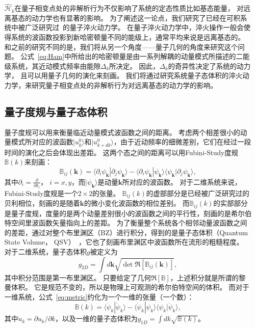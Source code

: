 			$\hat{\mathcal{H}}_k$在量子相变点处的非解析行为不仅影响了系统的定态性质比如基态能量， 对远离基态的动力学也有显著的影响。
			为了阐述这一论点，我们研究了已经在可积系统中被广泛研究过~\cite{Barthel2008,Calabrese2011,Mitra2018}的量子淬火动力学。
			在量子淬火动力学中，淬火操作一般会使得系统的波函数投影到新哈密顿量不同的能级上，通常平均来说是远离基态的。
			和之前的研究不同的是，我们将从另一个角度——量子几何的角度来研究这个问题。
			公式~\eqref{eq:Ham}中所给出的哈密顿量是由一系列解耦的动量模式所描述的二能级系统，其近动模式频率由能隙$\Delta_k$所决定。
			因此，$\Delta_k$的奇异性决定了系统的动力学， 且可以用量子几何的演化来刻画。
			我们将通过研究系统量子态体积的淬火动力学，来研究量子相变点处的非解析行为对远离基态的动力学的影响。
		
		\subsection{量子度规与量子态体积}
		
			量子度规可以用来衡量临近动量模式波函数之间的距离。
			考虑两个相差很小的动量模式所对应的波函数$|u^0_k\rangle$和$|u^0_{k+dk}\rangle$，由于近动频率的细微差别，它们在经过一段时间的演化之后会体现出差距。
			这两个态之间的距离可以用Fubini-Study度规$\mathbb{B}(k)$来刻画：
			\begin{equation}
				\mathbb{B}_{ij}(\mathbf{k})=\langle\partial_i \psi_\mathbf{k} |\partial_j \psi_\mathbf{k}\rangle-\langle\partial_i \psi_\mathbf{k} |\psi_\mathbf{k}\rangle \langle \psi_\mathbf{k}|\partial_j \psi_\mathbf{k}\rangle, \label{eq:metric}
			\end{equation}
			其中$\partial_i=\frac{\partial}{\partial k_i}$， $i=x,y$，而$|\psi_\mathbf{k}\rangle$是动量$\mathbf{k}$所对应的波函数。
			对于二维系统来说，Fubini-Study度规是一个$2\times2$的张量。
			$\mathbb{B}_{ij}(k)$的虚部部分是已经被广泛研究过的贝利相位，刻画的是随着$\mathbf{k}$的微小变化波函数的相位差别。
			而$\mathbb{B}_{ij}(k)$的实部部分是量子度规，度量的是两个动量差别很小的波函数之间的平行性，刻画的是希尔伯特空间里波函数矢量指向上的差距。
			为了衡量整个系统各个相邻动量波函数之间的差距，通过对整个布里渊区（BZ）进行积分，得到的是量子态体积（Quantum State Volume， QSV）~\cite{Ozawa20210}，它也了刻画布里渊区中波函数所在流形的粗糙程度。
			对于二维系统，量子态体积$g$被定义为
			\begin{equation} \label{eq:g_2D}
				g_{2D}=\int d\mathbf{k} \sqrt{\det\Re[\mathbb{B}_{ij}(\mathbf{k})]},
			\end{equation}
			其中积分范围是第一布里渊区。
			只要给定了几何$\Re[\mathbb{B}]$，上述积分就是所谓的黎曼体积。
			它是规范不变的，所以是物理上可观测的希尔伯特空间的体积。
			而对于一维系统，公式~\eqref{eq:metric}约化为一个一维的张量（一个数）：
			\begin{equation}\label{eq:B_1D}
				\mathbb{B}(k)= \langle \dot{\psi}_k|\dot{\psi}_k\rangle-\langle \dot{\psi}_k|\psi_k\rangle \langle \psi_k|\dot{\psi}_k \rangle,
			\end{equation}
			其中$\dot{u}_k=\partial u_k/\partial k$，以及一维的量子态体积为$g_{1D}=\int dk \sqrt{\mathbb{B}(k)}$。

